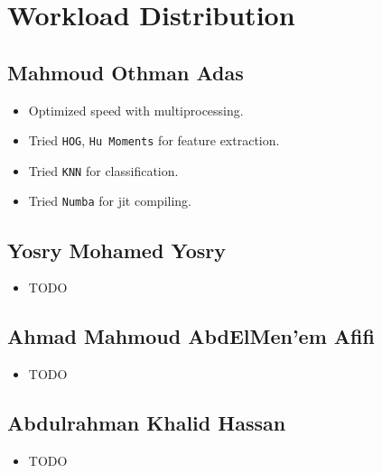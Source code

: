 \section{Workload Distribution}

\subsection{Mahmoud Othman Adas}
\begin{itemize}
    \item Optimized speed with multiprocessing.
    \item Tried \texttt{HOG}, \texttt{Hu Moments} for feature extraction.
    \item Tried \texttt{KNN} for classification.
    \item Tried \texttt{Numba} for jit compiling.
\end{itemize}

\subsection{Yosry Mohamed Yosry}
\begin{itemize}
    \item TODO
\end{itemize}

\subsection{Ahmad Mahmoud AbdElMen'em Afifi}
\begin{itemize}
    \item TODO
\end{itemize}

\subsection{Abdulrahman Khalid Hassan}
\begin{itemize}
    \item TODO
\end{itemize}
